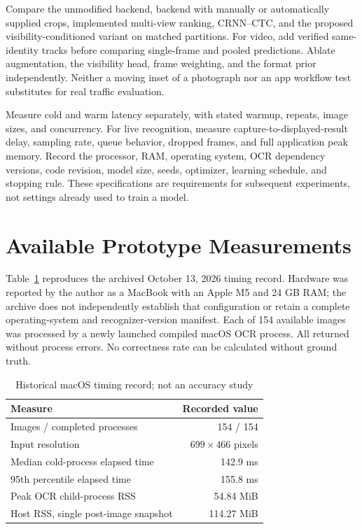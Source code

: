 \documentclass[journal]{IEEEtran}
\begin{document}
Compare the unmodified backend, backend with manually or automatically supplied crops, implemented multi-view ranking, CRNN--CTC, and the proposed visibility-conditioned variant on matched partitions. For video, add verified same-identity tracks before comparing single-frame and pooled predictions. Ablate augmentation, the visibility head, frame weighting, and the format prior independently. Neither a moving inset of a photograph nor an app workflow test substitutes for real traffic evaluation.

Measure cold and warm latency separately, with stated warmup, repeats, image sizes, and concurrency. For live recognition, measure capture-to-displayed-result delay, sampling rate, queue behavior, dropped frames, and full application peak memory. Record the processor, RAM, operating system, OCR dependency versions, code revision, model size, seeds, optimizer, learning schedule, and stopping rule. These specifications are requirements for subsequent experiments, not settings already used to train a model.

\section{Available Prototype Measurements}\label{sec:results}
Table~\ref{tab:timing} reproduces the archived October 13, 2026 timing record. Hardware was reported by the author as a MacBook with an Apple M5 and 24 GB RAM; the archive does not independently establish that configuration or retain a complete operating-system and recognizer-version manifest. Each of 154 available images was processed by a newly launched compiled macOS OCR process. All returned without process errors. No correctness rate can be calculated without ground truth.

\begin{table}[t]
\caption{Historical macOS timing record; not an accuracy study}
\label{tab:timing}
\centering\small
\begin{tabular}{@{}lr@{}}
\toprule
Measure & Recorded value \\
\midrule
Images / completed processes & 154 / 154 \\
Input resolution & $699\times466$ pixels \\
Median cold-process elapsed time & 142.9 ms \\
95th percentile elapsed time & 155.8 ms \\
Peak OCR child-process RSS & 54.84 MiB \\
Host RSS, single post-image snapshot & 114.27 MiB \\
\bottomrule
\end{tabular}
\end{table}
\end{document}
